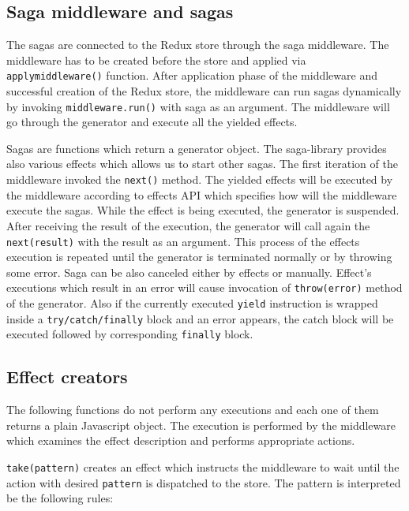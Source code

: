 \subsection{Saga middleware and sagas} \label{helpers}
The sagas are connected to the Redux store through the saga middleware. The middleware has to be created before the store and applied via \texttt{applymiddleware()} function. After application phase of the middleware and successful creation of the Redux store, the middleware can run sagas dynamically by invoking \texttt{middleware.run()} with saga as an argument. The middleware will go through the generator and execute all the yielded effects.

Sagas are functions which return a generator object. The saga-library provides also various effects which allows us to start other sagas. The first iteration of the middleware invoked the \texttt{next()} method. The yielded effects will be executed by the middleware according to effects API which specifies how will the middleware execute the sagas. While the effect is being executed, the generator is suspended. After receiving the result of the execution, the generator will call again the \texttt{next(result)} with the result as an argument. This process of the effects execution is repeated until the generator is terminated normally or by throwing some error. Saga can be also canceled either by effects or manually. Effect's executions which result in an error will cause invocation of \texttt{throw(error)} method of the generator. Also if the currently executed \texttt{yield} instruction is wrapped inside a \texttt{try/catch/finally} block and an error appears, the catch block will be executed followed by corresponding \texttt{finally} block.\cite{redux-saga-api}

\subsection{Effect creators}\label{effect_creators}
The following functions do not perform any executions and each one of them returns a plain Javascript object. The execution is performed by the middleware which examines the effect description and performs appropriate actions.

\texttt{take(pattern)} creates an effect which instructs the middleware to wait until the action with desired \texttt{pattern} is dispatched to the store. The pattern is interpreted be the following rules: 

